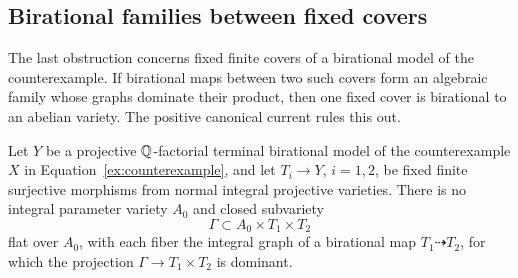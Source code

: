 \subsection{Birational families between fixed covers}

The last obstruction concerns fixed finite covers of a birational model
of the counterexample. If birational maps between two such covers form
an algebraic family whose graphs dominate their product, then one fixed
cover is birational to an abelian variety. The positive canonical current
rules this out.

\begin{proposition}\label{ex:fixed-cover}
Let \(Y\) be a projective \(\mathbb{Q}\)-factorial terminal birational model
of the counterexample \(X\) in Equation~\eqref{ex:counterexample}, and let
\(T_i\to Y\), \(i=1,2\), be fixed finite surjective morphisms from normal
integral projective varieties.
There is no integral parameter variety \(A_0\) and closed subvariety
\[
 \Gamma\subset A_0\times T_1\times T_2
\]
flat over \(A_0\), with each fiber the integral graph of a birational
map \(T_1\dashrightarrow T_2\), for which the projection
\(\Gamma\to T_1\times T_2\) is dominant.
\end{proposition}

